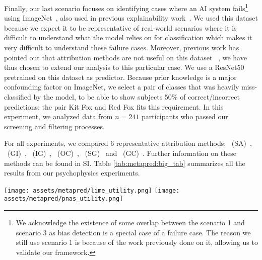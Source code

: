 Finally, our last scenario focuses on identifying cases where an AI system fails\footnote{We acknowledge the existence of some overlap between the scenario 1 and scenario 3 as bias detection is a special case of a failure case. The reason we still use scenario 1 is because of the work previously done on it, allowing us  to validate our framework.} using ImageNet~\cite{imagenet_cvpr09}, also used in previous explainability work~\cite{fong2017perturbation,elliott2021perceptualball,hooker2018benchmark,fel2021sobol, shen2020useful,nguyen2021effectiveness}. We used this dataset because we expect it to be representative of real-world scenarios where it is difficult to understand what the model relies on for classification which makes it very difficult to understand these failure cases. 
Moreover, previous work has pointed out that attribution methods are not useful on this dataset ~\cite{shen2020useful}, we have thus chosen to extend our analysis to this particular case.
We use a ResNet50~\cite{he2016deep} pretrained on this dataset as predictor. Because prior knowledge is a major confounding factor on ImageNet, we select a pair of classes that was heavily miss-classified by the model, to be able to show subjects 50\% of correct/incorrect predictions: the pair Kit Fox and Red Fox fits this requirement.
In this experiment, we analyzed data from $n=241$ participants who passed our screening and filtering processes.


For all experiments, we compared $6$ representative attribution methods: \expsa~(SA)~\cite{simonyan2014deep}, 
\expgi~(GI)~\cite{ancona2017better}, 
\expig~(IG)~\cite{sundararajan2017axiomatic},
\expoc~(OC)~\cite{zeiler2014visualizing},
\expsg~(SG)~\cite{smilkov2017smoothgrad} and 
\expgc~(GC)~\cite{selvaraju2017gradcam}.
Further information on these methods can be found in SI.
Table \ref{tab:metapred:big_tab} summarizes all the results from our psychophysics experiments. 

\begin{figure*}[t!]
    \texttt{[image: assets/metapred/lime\_utility.png]}
    \texttt{[image: assets/metapred/pnas\_utility.png]}
    \caption{\textbf{\metrick~for both Husky vs. Wolf (left) and the Leaves (right) dataset.} 
    The \metrick~of the explanation, or the accuracy of the human \mp~after training, is measured after each training session (3 in total) for the scenario (1) of bias detection (on the left) and the scenario (2) concerning the identification of new strategies. 
    Concerning the first scenario, all methods have a positive effect on the score obtained - they improve the subjects' ability to predict the model - and are thus useful to better understand the model. \expgc, \expoc~and \expsg~are particularly useful for bias detection. On the Leaves dataset~\cite{wilf2016computer}, explanations are also useful, but specifically \expsa, \expsg~and \expig.
    }
    \label{fig:metapred:utility}
\end{figure*}

